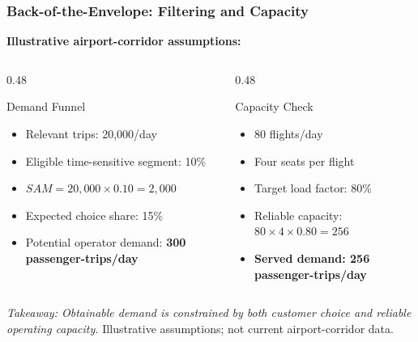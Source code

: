 \documentclass{beamer}
\begin{document}
\begin{frame}[t,shrink=10]
\frametitle{Back-of-the-Envelope: Filtering and Capacity}
\textbf{Illustrative airport-corridor assumptions:}
\begin{columns}[T]
\begin{column}{0.48\textwidth}\begin{block}{Demand Funnel}
\begin{itemize}
\item Relevant trips: 20,000/day
\item Eligible time-sensitive segment: 10\%
\item $SAM=20{,}000\times0.10=2{,}000$
\item Expected choice share: 15\%
\item Potential operator demand: \textbf{300 passenger-trips/day}
\end{itemize}\end{block}\end{column}
\begin{column}{0.48\textwidth}\begin{block}{Capacity Check}
\begin{itemize}
\item 80 flights/day
\item Four seats per flight
\item Target load factor: 80\%
\item Reliable capacity: $80\times4\times0.80=256$
\item \textbf{Served demand: 256 passenger-trips/day}
\end{itemize}\end{block}\end{column}
\end{columns}
\textit{Takeaway: Obtainable demand is constrained by both customer choice and reliable operating capacity.}
\vfill{\tiny Illustrative assumptions; not current airport-corridor data.}
\end{frame}
\end{document}
